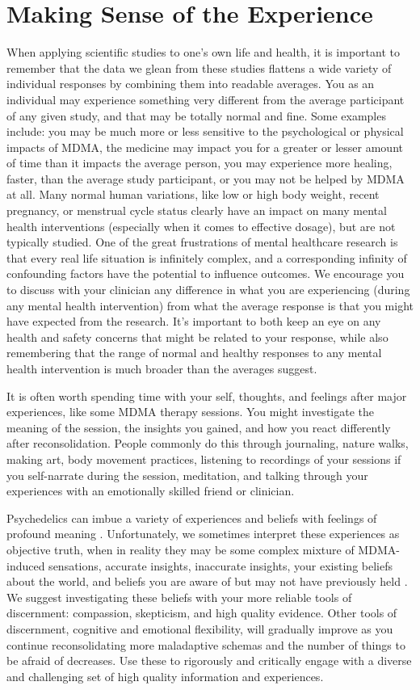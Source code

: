 \documentclass[12pt,letterpaper]{book}
\begin{document}
\section{Making Sense of the Experience}
When applying scientific studies to one's own life and health, it is important to remember that the data we glean from these studies flattens a wide variety of individual responses by combining them into readable averages. You as an individual may experience something very different from the average participant of any given study, and that may be totally normal and fine. Some examples include: you may be much more or less sensitive to the psychological or physical impacts of MDMA, the medicine may impact you for a greater or lesser amount of time than it impacts the average person, you may experience more healing, faster, than the average study participant, or you may not be helped by MDMA at all. Many normal human variations, like low or high body weight, recent pregnancy, or menstrual cycle status clearly have an impact on many mental health interventions (especially when it comes to effective dosage), but are not typically studied. One of the great frustrations of mental healthcare research is that every real life situation is infinitely complex, and a corresponding infinity of confounding factors have the potential to influence outcomes. We encourage you to discuss with your clinician any difference in what you are experiencing (during any mental health intervention) from what the average response is that you might have expected from the research. It's important to both keep an eye on any health and safety concerns that might be related to your response, while also remembering that the range of normal and healthy responses to any mental health intervention is much broader than the averages suggest.

It is often worth spending time with your self, thoughts, and feelings after major experiences, like some MDMA therapy sessions. You might investigate the meaning of the session, the insights you gained, and how you react differently after reconsolidation. People commonly do this through journaling, nature walks, making art, body movement practices, listening to recordings of your sessions if you self-narrate during the session, meditation, and talking through your experiences with an emotionally skilled friend or clinician.

Psychedelics can imbue a variety of experiences and beliefs with feelings of profound meaning \cite{hartogsohn2018meaning}. Unfortunately, we sometimes interpret these experiences as objective truth, when in reality they may be some complex mixture of MDMA-induced sensations, accurate insights, inaccurate insights, your existing beliefs about the world, and beliefs you are aware of but may not have previously held \cite{mcgovern2024integrated}. We suggest investigating these beliefs with your more reliable tools of discernment: compassion, skepticism, and high quality evidence. Other tools of discernment, cognitive and emotional flexibility, will gradually improve as you continue reconsolidating more maladaptive schemas and the number of things to be afraid of decreases. Use these to rigorously and critically engage with a diverse and challenging set of high quality information and experiences.
\end{document}
